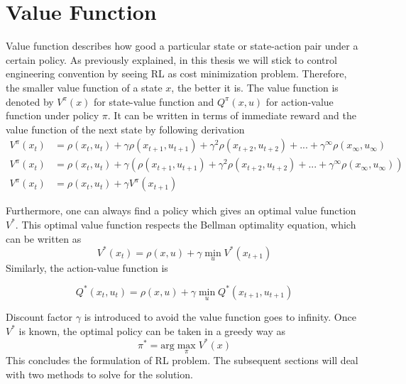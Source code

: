 \section{Value Function} \label{sec:value}
Value function describes how good a particular state or state-action pair under a certain policy. As previously explained, in this thesis we will stick to control engineering convention by seeing \acs{RL} as cost minimization problem. Therefore, the smaller value function of a state $x$, the better it is. The value function is denoted by $ V^{\pi}(x) $ for state-value function and $ Q^{\pi}(x,u) $ for action-value function under policy $\pi$. It can be written in terms of immediate reward and the value function of the next state by following derivation
\begin{equation}
\begin{split}
V^{\pi}(x_t) &= \rho(x_t,u_t) + \gamma \rho(x_{t+1},u_{t+1}) + \gamma^2 \rho(x_{t+2},u_{t+2}) + ... + \gamma^{\infty}\rho(x_{\infty},u_{\infty}) \\
V^{\pi}(x_t) &= \rho(x_t,u_t) + \gamma \left( \rho(x_{t+1},u_{t+1}) + \gamma^2 \rho(x_{t+2},u_{t+2}) + ... + \gamma^{\infty}\rho(x_{\infty},u_{\infty})\right)  \\
V^{\pi}(x_t) &= \rho(x_t,u_t) + \gamma V^{\pi}(x_{t+1})
\end{split}
\end{equation} 

Furthermore, one can always find a policy which gives an optimal value function $V^*$. This optimal value function respects the Bellman optimality equation, which can be written as 
\begin{equation}
V^*(x_t) = \rho(x,u) + \gamma \min_{u} V^*(x_{t+1})
\label{eq:bellman}
\end{equation}
Similarly, the action-value function is

\begin{equation}
Q^*(x_t,u_t) = \rho(x,u) + \gamma \min_{u} Q^*(x_{t+1},u_{t+1})
\label{eq:bellman2}
\end{equation}

Discount factor $\gamma$ is introduced to avoid the value function goes to infinity. Once $V^*$ is known, the optimal policy can be taken in a greedy way as
\begin{equation}
\pi^* = \text{arg} \max_{\pi} V^*(x)
\label{eq:optPi}
\end{equation}
This concludes the formulation of \acs{RL} problem. The subsequent sections will deal with two methods to solve for the solution.

